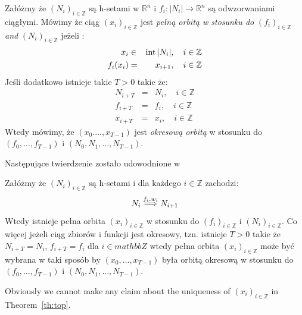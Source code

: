 \begin{definition}\label{def:orbitWithRespectTo}
Załóżmy że $(N_i)_{i\in\mathbb Z}$ są h-setami w $\mathbb R^n$ i
$f_i:|N_i|\to\mathbb R^n$ są odwzorwaniami ciągłymi. Mówimy że ciąg 
$(x_i)_{i\in\mathbb Z}$ jest \emph{pełną orbitą w stosunku do }
$(f_i)_{i\in\mathbb Z}$ \emph{and} $(N_i)_{i\in\mathbb Z}$ jeżeli :
\begin{eqnarray*}
    x_i &\in &{\rm int}\, |N_i|,\quad i\in\mathbb Z\\
   f_{i}(x_i)&=&x_{i+1},\quad i\in\mathbb Z
\end{eqnarray*}
Jeśli dodatkowo istnieje takie $T>0$ takie że:
\begin{eqnarray*}
    N_{i+T}&=&N_i,\quad i\in\mathbb Z\\
    f_{i+T}&=&f_i,\quad i\in\mathbb Z\\
    x_{i+T}&=&x_i,\quad i\in\mathbb Z
\end{eqnarray*}
Wtedy mówimy, że $(x_0. \ldots, x_{T-1})$ jest \emph{okresową orbitą}
w stosunku do $(f_0,\ldots, f_{T-1})$ i $(N_0,N_1,\ldots,N_{T-1})$.
\end{definition}

Następujące twierdzenie zostało udowodnione w \cite{ZGi}
\begin{theorem} \cite[Theorem 9]{ZGi}
\label{th:top}
Załóżmy że $(N_i)_{i\in\mathbb Z}$ są h-setami i dla każdego $i \in \mathbb Z$ zachodzi:
\begin{equation*}
  N_{i} \stackrel{f_i,w_i}{\Longrightarrow} N_{i+1}
\end{equation*}
Wtedy istnieje pełna orbita $(x_i)_{i \in \mathbb Z }$ w stosunku do 
$(f_i)_{i\in\mathbb Z}$ i $(N_i)_{i\in\mathbb Z}$. Co więcej jeżeli 
ciąg zbiorów i funkcji jest okresowy, tzn. istnieje $T>0$ takie że 
$N_{i+T} = N_i$, $f_{i+T} = f_i$ dla $i \in mathbb Z$ wtedy pełna orbita 
$(x_i)_{i\in\mathbb Z}$ może być wybrana w taki sposób by $(x_0,\ldots,x_{T-1})$
była orbitą okresową w stosunku do $(f_0,\ldots,f_{T-1})$ i $(N_0,N_1,\ldots,N_{T-1})$.
\end{theorem}

Obviously we cannot make any claim about the uniqueness of
$(x_i)_{i\in\mathbb Z}$ in Theorem~\ref{th:top}.